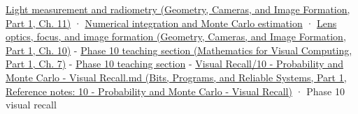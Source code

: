 \href{../03-Geometry-Cameras-and-Image-Formation-P01/main.pdf\#nameddest=03-visual-computing-i-ch004-light-measurement-and-radiometry}{Light measurement and radiometry (Geometry, Cameras, and Image Formation, Part 1, Ch. 11)} · \hyperref[03-visual-computing-i-ch012-numerical-integration-and-monte-carlo-estimation]{Numerical integration and Monte Carlo estimation} · \href{../03-Geometry-Cameras-and-Image-Formation-P01/main.pdf\#nameddest=03-visual-computing-i-ch003-lens-optics-focus-and-image-formation}{Lens optics, focus, and image formation (Geometry, Cameras, and Image Formation, Part 1, Ch. 10)} - \href{../02-Mathematics-for-Visual-Computing-P01/main.pdf\#nameddest=02-foundations-ii-ch023-random-quantities-and-their-probability-laws}{Phase 10 teaching section (Mathematics for Visual Computing, Part 1, Ch. 7)} - \hyperref[02-foundations-ii-ch029-transformations-turn-simple-inputs-into-useful-samples]{Phase 10 teaching section} - \href{../01-Bits-Programs-and-Reliable-Systems-P01/main.pdf\#nameddest=appendix-cb5af353ef77}{Visual Recall/10 - Probability and Monte Carlo - Visual Recall.md (Bits, Programs, and Reliable Systems, Part 1, Reference notes: 10 - Probability and Monte Carlo - Visual Recall)} · Phase 10 visual recall
